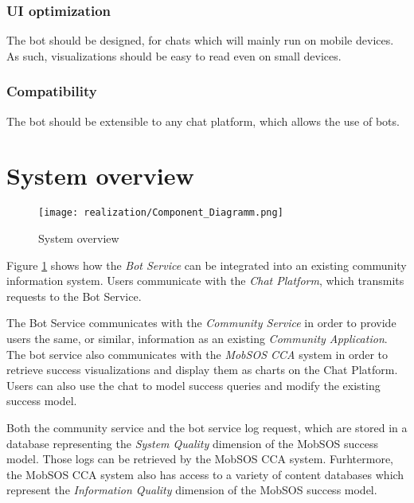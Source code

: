 \subsubsection{UI optimization} The bot should be designed, for chats which will mainly run on mobile devices. As such, visualizations should be easy to read even on small devices.

\subsubsection{Compatibility} The bot should be extensible to any chat platform, which allows the use of bots.

\section{System overview}


\begin{figure}[h]
    \centering
    \texttt{[image: realization/Component\_Diagramm.png]}
    \caption{System overview}
    \label{fig:sytsemOverview}
\end{figure}

Figure \ref{fig:sytsemOverview} shows how the \emph{Bot Service} can be integrated into an existing community information system. Users communicate with the \emph{Chat Platform}, which transmits requests to the Bot Service.

The Bot Service communicates with the \emph{Community Service} in order to provide users the same, or similar, information as an existing \emph{Community Application}. The bot service also communicates with the \emph{MobSOS CCA} system in order to retrieve success visualizations and display them as charts on the Chat Platform. Users can also use the chat to model success queries and modify the existing success model.

Both the community service and the bot service log request, which are stored in a database representing the \emph{System Quality} dimension of the MobSOS success model. Those logs can be retrieved by the MobSOS CCA system. Furhtermore, the MobSOS CCA system also has access to a variety of content databases which represent the \emph{Information Quality} dimension of the MobSOS success model.